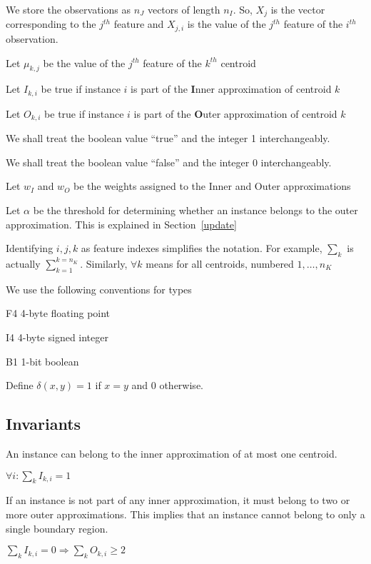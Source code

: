 We store the observations as \(n_J\) vectors of length \(n_I\). So, \(X_j\) is
the vector corresponding to the \(j^{th}\) feature and \(X_{j, i}\) is the value
of the \(j^{th}\) feature of the \(i^{th}\) observation.
\item Let \(\mu_{k, j}\) be the value of the \(j^{th}\) feature of the \(k^{th}\)
centroid
\item Let \(I_{k, i}\) be true if instance \(i\) is part of the 
{\bf I}nner approximation of centroid \(k\)
\item Let \(O_{k, i}\) be true if instance \(i\) is part of the 
{\bf O}uter approximation of centroid \(k\)
\item We shall treat the boolean value ``true'' and the integer
1 interchangeably. 
\item We shall treat the boolean value ``false'' and the integer
0 interchangeably. 
\item Let \(w_I\) and \(w_O\) be the weights assigned to the Inner and Outer
approximations
\item Let \(\alpha\) be the threshold for determining whether an instance
belongs to the outer approximation. This is explained in 
Section~\ref{update}
\item Identifying \(i, j, k\) as feature indexes simplifies the notation. For
example, \(\sum_k\) is actually \(\sum_{k=1}^{k=n_K}\). Similarly, \(\forall k\)
means for all centroids, numbered \(1, \ldots, n_K\)
\item We use the following conventions for types
\bd 
\item F4 4-byte floating point
\item I4 4-byte signed integer
\item B1 1-bit boolean
\ed
\item Define \(\delta(x, y) = 1 \) if \(x = y\) and 0 otherwise.
\ee

\subsection{Invariants}

\begin{invariant}
An instance can belong to the inner approximation of at most one centroid.

\(\forall i: \sum_k I_{k, i} = 1\)
\end{invariant}

\begin{invariant}
If an instance is not part of any inner approximation, it must belong to 
two or more outer approximations. This implies that an instance cannot belong to only a single boundary region.

\(\sum_k I_{k, i} = 0 \Rightarrow \sum_k O_{k, i} \geq 2\)

\end{invariant}


